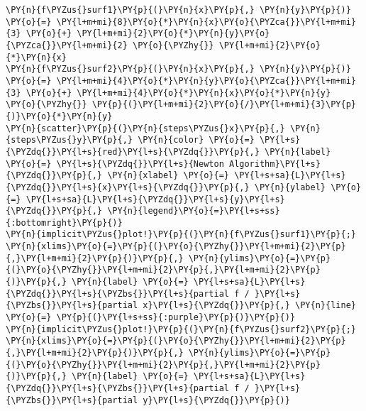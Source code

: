     \begin{tcolorbox}[breakable, size=fbox, boxrule=1pt, pad at break*=1mm,colback=cellbackground, colframe=cellborder]
\begin{Verbatim}[commandchars=\\\{\}]
\PY{n}{f\PYZus{}surf1}\PY{p}{(}\PY{n}{x}\PY{p}{,} \PY{n}{y}\PY{p}{)} \PY{o}{=} \PY{l+m+mi}{8}\PY{o}{*}\PY{n}{x}\PY{o}{\PYZca{}}\PY{l+m+mi}{3} \PY{o}{+} \PY{l+m+mi}{2}\PY{o}{*}\PY{n}{y}\PY{o}{\PYZca{}}\PY{l+m+mi}{2} \PY{o}{\PYZhy{}} \PY{l+m+mi}{2}\PY{o}{*}\PY{n}{x}
\PY{n}{f\PYZus{}surf2}\PY{p}{(}\PY{n}{x}\PY{p}{,} \PY{n}{y}\PY{p}{)} \PY{o}{=} \PY{l+m+mi}{4}\PY{o}{*}\PY{n}{y}\PY{o}{\PYZca{}}\PY{l+m+mi}{3} \PY{o}{+} \PY{l+m+mi}{4}\PY{o}{*}\PY{n}{x}\PY{o}{*}\PY{n}{y} \PY{o}{\PYZhy{}} \PY{p}{(}\PY{l+m+mi}{2}\PY{o}{/}\PY{l+m+mi}{3}\PY{p}{)}\PY{o}{*}\PY{n}{y}
\PY{n}{scatter}\PY{p}{(}\PY{n}{steps\PYZus{}x}\PY{p}{,} \PY{n}{steps\PYZus{}y}\PY{p}{,} \PY{n}{color} \PY{o}{=} \PY{l+s}{\PYZdq{}}\PY{l+s}{red}\PY{l+s}{\PYZdq{}}\PY{p}{,} \PY{n}{label} \PY{o}{=} \PY{l+s}{\PYZdq{}}\PY{l+s}{Newton Algorithm}\PY{l+s}{\PYZdq{}}\PY{p}{,} \PY{n}{xlabel} \PY{o}{=} \PY{l+s+sa}{L}\PY{l+s}{\PYZdq{}}\PY{l+s}{x}\PY{l+s}{\PYZdq{}}\PY{p}{,} \PY{n}{ylabel} \PY{o}{=} \PY{l+s+sa}{L}\PY{l+s}{\PYZdq{}}\PY{l+s}{y}\PY{l+s}{\PYZdq{}}\PY{p}{,} \PY{n}{legend}\PY{o}{=}\PY{l+s+ss}{:bottomright}\PY{p}{)}
\PY{n}{implicit\PYZus{}plot!}\PY{p}{(}\PY{n}{f\PYZus{}surf1}\PY{p}{;} \PY{n}{xlims}\PY{o}{=}\PY{p}{(}\PY{o}{\PYZhy{}}\PY{l+m+mi}{2}\PY{p}{,}\PY{l+m+mi}{2}\PY{p}{)}\PY{p}{,} \PY{n}{ylims}\PY{o}{=}\PY{p}{(}\PY{o}{\PYZhy{}}\PY{l+m+mi}{2}\PY{p}{,}\PY{l+m+mi}{2}\PY{p}{)}\PY{p}{,} \PY{n}{label} \PY{o}{=} \PY{l+s+sa}{L}\PY{l+s}{\PYZdq{}}\PY{l+s}{\PYZbs{}}\PY{l+s}{partial f / }\PY{l+s}{\PYZbs{}}\PY{l+s}{partial x}\PY{l+s}{\PYZdq{}}\PY{p}{,} \PY{n}{line} \PY{o}{=} \PY{p}{(}\PY{l+s+ss}{:purple}\PY{p}{)}\PY{p}{)}
\PY{n}{implicit\PYZus{}plot!}\PY{p}{(}\PY{n}{f\PYZus{}surf2}\PY{p}{;} \PY{n}{xlims}\PY{o}{=}\PY{p}{(}\PY{o}{\PYZhy{}}\PY{l+m+mi}{2}\PY{p}{,}\PY{l+m+mi}{2}\PY{p}{)}\PY{p}{,} \PY{n}{ylims}\PY{o}{=}\PY{p}{(}\PY{o}{\PYZhy{}}\PY{l+m+mi}{2}\PY{p}{,}\PY{l+m+mi}{2}\PY{p}{)}\PY{p}{,} \PY{n}{label} \PY{o}{=} \PY{l+s+sa}{L}\PY{l+s}{\PYZdq{}}\PY{l+s}{\PYZbs{}}\PY{l+s}{partial f / }\PY{l+s}{\PYZbs{}}\PY{l+s}{partial y}\PY{l+s}{\PYZdq{}}\PY{p}{)}
\end{Verbatim}
\end{tcolorbox}
 
            
    
    \begin{center}
    \end{center}
    { \hspace*{\fill} \\}